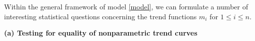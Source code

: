 \documentclass[a4paper,12pt]{article}
\begin{document}
Within the general framework of model \eqref{model}, we can formulate a number of interesting statistical questions concerning the trend functions $m_i$ for $1 \le i \le n$. 

\vspace{10pt}


\noindent \textbf{(a) Testing for equality of nonparametric trend curves } 
\vspace{10pt} 

 
\end{document}
